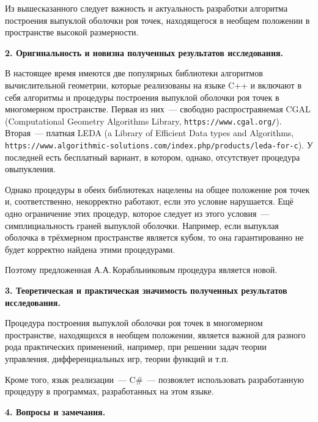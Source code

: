 \documentclass[12pt]{article}
\begin{document}
Из вышесказанного следует важность и актуальность разработки алгоритма построения выпуклой оболочки роя точек, находящегося в необщем положении в пространстве высокой размерности.

\smallskip

\noindent
\textbf{2. Оригинальность и новизна полученных результатов исследования.}

\smallskip

В настоящее время имеются две популярных библиотеки алгоритмов вычислительной геометрии, которые реализованы на языке C++ и включают в себя алгоритмы и процедуры построения выпуклой оболочки роя точек в многомерном пространстве. Первая из них~--- свободно распростраянемая CGAL (Computational Geometry Algorithms Library, \texttt{https://www.cgal.org/}). Вторая~--- платная LEDA (a Library of Efficient Data types and Algorithms, \texttt{https://www.algorithmic-solutions.com/index.php/products/leda-for-c}). У последней есть бесплатный вариант, в котором, однако, отсутствует процедура овыпукления.

Однако процедуры в обеих библиотеках нацелены на общее положение роя точек и, соответственно, некорректно работают, если это условие нарушается. Ещё одно ограничение этих процедур, которое следует из этого условия~--- симплициальность граней выпуклой оболочки. Например, если выпуклая оболочка в трёхмерном пространстве является кубом, то она гарантированно не будет корректно найдена этими процедурами.

Поэтому предложенная А.А.\,Корабльниковым процедура является новой.

\smallskip

{\raggedright

\noindent
\textbf{3. Теоретическая и практическая значимость полученных результатов исследования.}

}

\smallskip

Процедура построения выпуклой оболочки роя точек в многомерном пространстве, находящихся в необщем положении, является важной для разного рода практических применений, например, при решении задач теории управления, дифференциальных игр, теории функций и т.п.

Кроме того, язык реализации~--- C\#~--- позвоялет использовать разработанную процедуру в программах, разработанных на этом языке.

\smallskip

\noindent
\textbf{4. Вопросы и замечания.}

\smallskip
\end{document}
